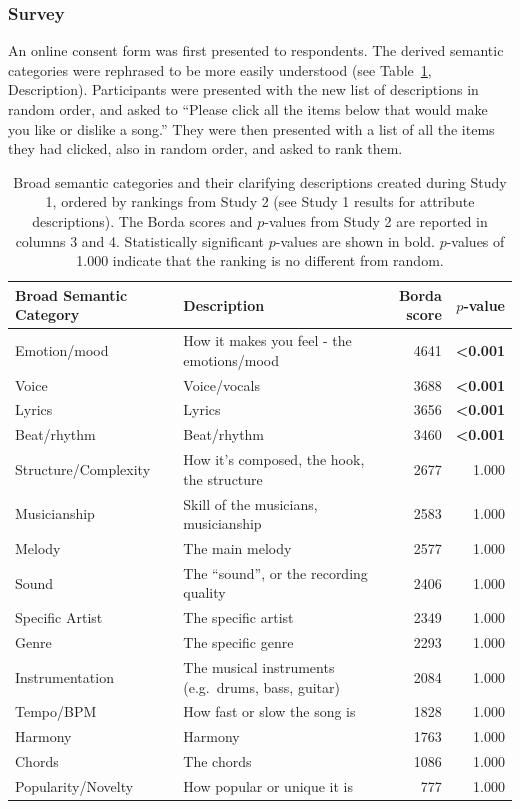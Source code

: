 \documentclass{article}
\begin{document}
\subsubsection{Survey}
An online consent form was first presented to respondents.
The derived semantic categories were rephrased to be more easily understood (see Table~\ref{tab:mus-attributes}, Description).
Participants were presented with the new list of descriptions in random order, and asked to ``Please click all the items below that would make you like or dislike a song.'' They were then presented with a list of all the items they had clicked, also in random order, and asked to rank them.

\begin{table}[h!]
\begin{center}
\begin{tabular}{ l  l  r  r }
\hline
\textbf{Broad Semantic Category} & \textbf{Description} &\textbf{Borda score} & \textbf{$p$-value}\\
\hline
Emotion/mood & How it makes you feel - the emotions/mood & 4641 & \textbf{\textless 0.001}\\
Voice & Voice/vocals & 3688 & \textbf{\textless 0.001}\\
Lyrics & Lyrics & 3656 & \textbf{\textless 0.001}\\
Beat/rhythm & Beat/rhythm & 3460 & \textbf{\textless 0.001}\\
Structure/Complexity & How it's composed, the hook, the structure & 2677 & 1.000\\
Musicianship & Skill of the musicians, musicianship & 2583 & 1.000\\
Melody & The main melody & 2577 & 1.000\\
Sound & The ``sound'', or the recording quality & 2406 & 1.000\\
Specific Artist & The specific artist & 2349 & 1.000\\
Genre & The specific genre & 2293 & 1.000\\
Instrumentation & The musical instruments (e.g.~drums, bass, guitar) & 2084 & 1.000\\
Tempo/BPM & How fast or slow the song is & 1828 & 1.000\\
Harmony & Harmony & 1763 & 1.000\\
Chords & The chords & 1086 & 1.000\\
Popularity/Novelty & How popular or unique it is & 777 & 1.000\\
\hline
\end{tabular}
\end{center}
\caption{Broad semantic categories and their clarifying descriptions created during Study 1, ordered by rankings from Study 2 (see Study 1 results for attribute descriptions). The Borda scores and $p$-values from Study 2 are reported in columns 3 and 4. Statistically significant $p$-values are shown in bold. $p$-values of 1.000 indicate that the ranking is no different from random.}
\label{tab:mus-attributes}
\end{table}
\end{document}
